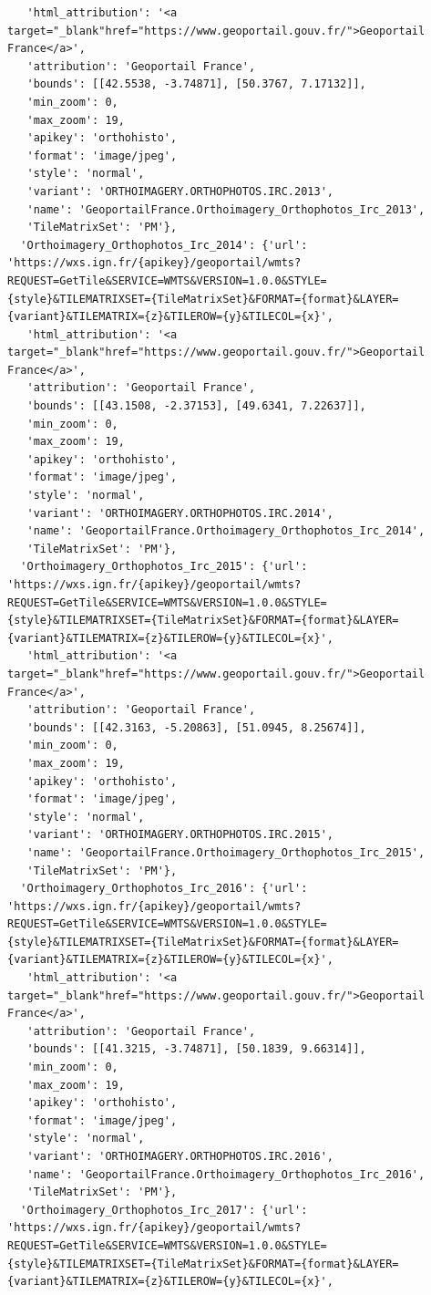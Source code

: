 \documentclass[
  letterpaper,
  DIV=11,
  numbers=noendperiod]{scrreprt}
\begin{document}
\begin{verbatim}
   'html_attribution': '<a target="_blank"href="https://www.geoportail.gouv.fr/">Geoportail France</a>',
   'attribution': 'Geoportail France',
   'bounds': [[42.5538, -3.74871], [50.3767, 7.17132]],
   'min_zoom': 0,
   'max_zoom': 19,
   'apikey': 'orthohisto',
   'format': 'image/jpeg',
   'style': 'normal',
   'variant': 'ORTHOIMAGERY.ORTHOPHOTOS.IRC.2013',
   'name': 'GeoportailFrance.Orthoimagery_Orthophotos_Irc_2013',
   'TileMatrixSet': 'PM'},
  'Orthoimagery_Orthophotos_Irc_2014': {'url': 'https://wxs.ign.fr/{apikey}/geoportail/wmts?REQUEST=GetTile&SERVICE=WMTS&VERSION=1.0.0&STYLE={style}&TILEMATRIXSET={TileMatrixSet}&FORMAT={format}&LAYER={variant}&TILEMATRIX={z}&TILEROW={y}&TILECOL={x}',
   'html_attribution': '<a target="_blank"href="https://www.geoportail.gouv.fr/">Geoportail France</a>',
   'attribution': 'Geoportail France',
   'bounds': [[43.1508, -2.37153], [49.6341, 7.22637]],
   'min_zoom': 0,
   'max_zoom': 19,
   'apikey': 'orthohisto',
   'format': 'image/jpeg',
   'style': 'normal',
   'variant': 'ORTHOIMAGERY.ORTHOPHOTOS.IRC.2014',
   'name': 'GeoportailFrance.Orthoimagery_Orthophotos_Irc_2014',
   'TileMatrixSet': 'PM'},
  'Orthoimagery_Orthophotos_Irc_2015': {'url': 'https://wxs.ign.fr/{apikey}/geoportail/wmts?REQUEST=GetTile&SERVICE=WMTS&VERSION=1.0.0&STYLE={style}&TILEMATRIXSET={TileMatrixSet}&FORMAT={format}&LAYER={variant}&TILEMATRIX={z}&TILEROW={y}&TILECOL={x}',
   'html_attribution': '<a target="_blank"href="https://www.geoportail.gouv.fr/">Geoportail France</a>',
   'attribution': 'Geoportail France',
   'bounds': [[42.3163, -5.20863], [51.0945, 8.25674]],
   'min_zoom': 0,
   'max_zoom': 19,
   'apikey': 'orthohisto',
   'format': 'image/jpeg',
   'style': 'normal',
   'variant': 'ORTHOIMAGERY.ORTHOPHOTOS.IRC.2015',
   'name': 'GeoportailFrance.Orthoimagery_Orthophotos_Irc_2015',
   'TileMatrixSet': 'PM'},
  'Orthoimagery_Orthophotos_Irc_2016': {'url': 'https://wxs.ign.fr/{apikey}/geoportail/wmts?REQUEST=GetTile&SERVICE=WMTS&VERSION=1.0.0&STYLE={style}&TILEMATRIXSET={TileMatrixSet}&FORMAT={format}&LAYER={variant}&TILEMATRIX={z}&TILEROW={y}&TILECOL={x}',
   'html_attribution': '<a target="_blank"href="https://www.geoportail.gouv.fr/">Geoportail France</a>',
   'attribution': 'Geoportail France',
   'bounds': [[41.3215, -3.74871], [50.1839, 9.66314]],
   'min_zoom': 0,
   'max_zoom': 19,
   'apikey': 'orthohisto',
   'format': 'image/jpeg',
   'style': 'normal',
   'variant': 'ORTHOIMAGERY.ORTHOPHOTOS.IRC.2016',
   'name': 'GeoportailFrance.Orthoimagery_Orthophotos_Irc_2016',
   'TileMatrixSet': 'PM'},
  'Orthoimagery_Orthophotos_Irc_2017': {'url': 'https://wxs.ign.fr/{apikey}/geoportail/wmts?REQUEST=GetTile&SERVICE=WMTS&VERSION=1.0.0&STYLE={style}&TILEMATRIXSET={TileMatrixSet}&FORMAT={format}&LAYER={variant}&TILEMATRIX={z}&TILEROW={y}&TILECOL={x}',

\end{verbatim}
\end{document}
